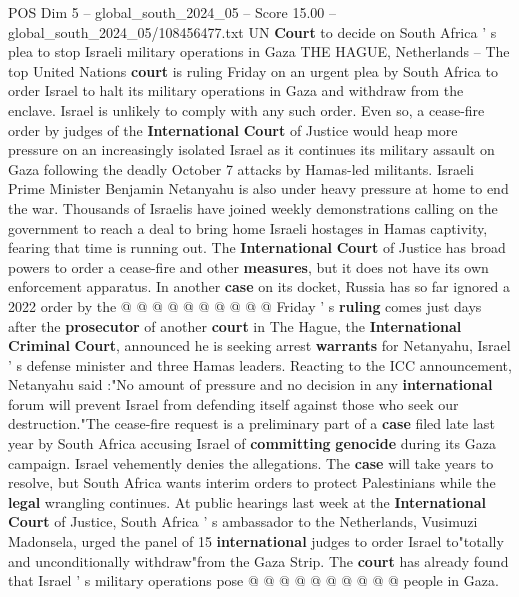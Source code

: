 \begin{textsample}{POS Dim 5 – global\_south\_2024\_05 – Score 15.00 – global\_south\_2024\_05/108456477.txt}  \label{ex:f5_pos_124}
UN \textbf{Court} to decide on South Africa ' s plea to stop Israeli military operations in Gaza THE HAGUE, Netherlands -- The top United Nations \textbf{court} is ruling Friday on an urgent plea by South Africa to order Israel to halt its military operations in Gaza and withdraw from the enclave.
Israel is unlikely to comply with any such order.
Even so, a cease-fire order by judges of the \textbf{International} \textbf{Court} of Justice would heap more pressure on an increasingly isolated Israel as it continues its military assault on Gaza following the deadly October 7 attacks by Hamas-led militants.
Israeli Prime Minister Benjamin Netanyahu is also under heavy pressure at home to end the war.
Thousands of Israelis have joined weekly demonstrations calling on the government to reach a deal to bring home Israeli hostages in Hamas captivity, fearing that time is running out.
The \textbf{International} \textbf{Court} of Justice has broad powers to order a cease-fire and other \textbf{measures}, but it does not have its own enforcement apparatus.
In another \textbf{case} on its docket, Russia has so far ignored a 2022 order by the @ @ @ @ @ @ @ @ @ @ Friday ' s \textbf{ruling} comes just days after the \textbf{prosecutor} of another \textbf{court} in The Hague, the \textbf{International} \textbf{Criminal} \textbf{Court}, announced he is seeking arrest \textbf{warrants} for Netanyahu, Israel ' s defense minister and three Hamas leaders.
Reacting to the ICC announcement, Netanyahu said :"No amount of pressure and no decision in any \textbf{international} forum will prevent Israel from defending itself against those who seek our destruction."The cease-fire request is a preliminary part of a \textbf{case} filed late last year by South Africa accusing Israel of \textbf{committing} \textbf{genocide} during its Gaza campaign.
Israel vehemently denies the allegations.
The \textbf{case} will take years to resolve, but South Africa wants interim orders to protect Palestinians while the \textbf{legal} wrangling continues.
At public hearings last week at the \textbf{International} \textbf{Court} of Justice, South Africa ' s ambassador to the Netherlands, Vusimuzi Madonsela, urged the panel of 15 \textbf{international} judges to order Israel to"totally and unconditionally withdraw"from the Gaza Strip.
The \textbf{court} has already found that Israel ' s military operations pose @ @ @ @ @ @ @ @ @ @ people in Gaza.

\end{textsample}
